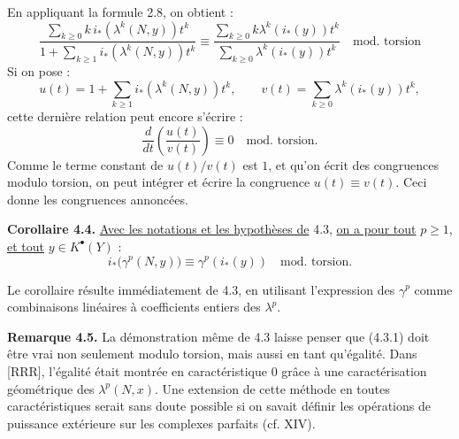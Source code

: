 
En
appliquant la formule 2.8, on obtient :
\[
  \frac{\sum_{k\ge0}k\,i_*(\lambda^k(N,y))t^k}
       {1+\sum_{k\ge1} i_*(\lambda^k(N,y))t^k}
  \equiv
  \frac{\sum_{k\ge0}k\lambda^k(i_*(y))t^k}
       {\sum_{k\ge0}\lambda^k(i_*(y))t^k}
       \quad\text{mod.\ torsion}
\]
Si on pose :
\[
  u(t)=1+\sum_{k\ge1}i_*(\lambda^k(N,y))t^k,\qquad
  v(t)=\sum_{k\ge0}\lambda^k(i_*(y))t^k,
\]
cette dernière relation peut encore s'écrire :
\[
  \frac{d}{dt}\!\left(\frac{u(t)}{v(t)}\right)\equiv0
  \quad\text{mod.\ torsion}.
\]
Comme le terme constant de \(u(t)/v(t)\) est \(1\), et qu'on écrit des congruences modulo torsion, on peut intégrer et écrire la congruence \(u(t)\equiv v(t)\). Ceci donne les congruences annoncées.

\textbf{Corollaire 4.4.} \uline{Avec les notations et les hypothèses de} 4.3, \uline{on a pour tout} \(p\ge1\), \uline{et tout} \(y\in K^{\bullet}(Y)\) :
\[
  i_*\bigl(\gamma^p(N,y)\bigr)\equiv \gamma^p(i_*(y))
  \quad\text{mod.\ torsion}.
\]

Le corollaire résulte immédiatement de 4.3, en utilisant l'expression des \(\gamma^p\) comme combinaisons linéaires à coefficients entiers des \(\lambda^p\).

\textbf{Remarque 4.5.} La démonstration même de 4.3 laisse penser que (4.3.1) doit être vrai non seulement modulo torsion, mais aussi en tant qu'égalité. Dans [RRR], l'égalité était montrée en caractéristique \(0\) grâce à une caractérisation géométrique des \(\lambda^p(N,x)\). Une extension de cette méthode en toutes caractéristiques serait sans doute possible si on savait définir les opérations de puissance extérieure sur les complexes parfaits (cf. XIV).

